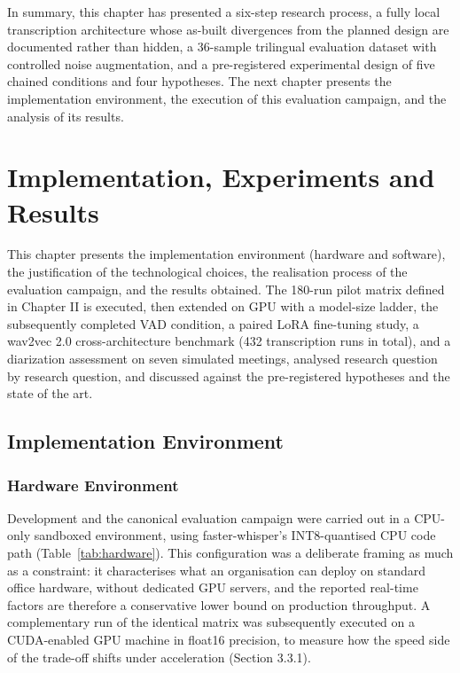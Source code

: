 \documentclass[12pt]{report}
\begin{document}
\vspace{0.5em}
In summary, this chapter has presented a six-step research process, a fully local transcription architecture whose as-built divergences from the planned design are documented rather than hidden, a 36-sample trilingual evaluation dataset with controlled noise augmentation, and a pre-registered experimental design of five chained conditions and four hypotheses. The next chapter presents the implementation environment, the execution of this evaluation campaign, and the analysis of its results.

\chapter{Implementation, Experiments and Results}

This chapter presents the implementation environment (hardware and software), the justification of the technological choices, the realisation process of the evaluation campaign, and the results obtained. The 180-run pilot matrix defined in Chapter II is executed, then extended on GPU with a model-size ladder, the subsequently completed VAD condition, a paired LoRA fine-tuning study, a wav2vec 2.0 cross-architecture benchmark (432 transcription runs in total), and a diarization assessment on seven simulated meetings, analysed research question by research question, and discussed against the pre-registered hypotheses and the state of the art.

\section{Implementation Environment}

\subsection{Hardware Environment}

Development and the canonical evaluation campaign were carried out in a CPU-only sandboxed environment, using faster-whisper's INT8-quantised CPU code path (Table~\ref{tab:hardware}). This configuration was a deliberate framing as much as a constraint: it characterises what an organisation can deploy on standard office hardware, without dedicated GPU servers, and the reported real-time factors are therefore a conservative lower bound on production throughput. A complementary run of the identical matrix was subsequently executed on a CUDA-enabled GPU machine in float16 precision, to measure how the speed side of the trade-off shifts under acceleration (Section 3.3.1).
\end{document}
